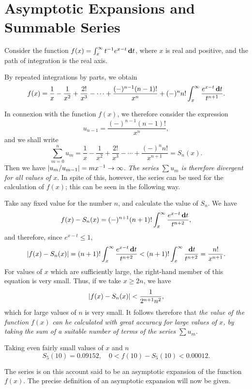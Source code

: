 \chapter{Asymptotic Expansions and Summable Series}


Consider the function $f(x) = \int_{x}^{\infty} t^{-1} e^{x-t}
\, \mathbf{d} t$, where $x$ is real and positive, and the path of
integration is the real axis.

By repeated integrations by parts, we obtain
$$
f(x) = \frac{1}{x} - \frac{1}{x^{2}} + \frac{2!}{x^{3}} - \cdots +
\frac{ (-)^{n-1} (n-1)!}{x^{n}} + (-)^{n} n! \int_{x}^{\infty}
\frac{e^{x-t} \, \mathbf{d} t}{t^{n+1}}.
$$

In connexion with the function $f(x)$, we therefore consider the
expression
$$
u_{n-1} = \frac{ (-)^{n-1} (n-1)!}{x^{n}},
$$
and we shall write
$$
\sum_{m=0}^{n} u_{m} = \frac{1}{x} - \frac{1}{x^{2}} +
\frac{2!}{x^{3}} - \cdots + \frac{ (-)^{n} n!}{x^{n+1}} = S_{n}(x).
$$
Then we have $\left| u_{m}/u_{m-1} \right| = mx^{-1} \rightarrow \infty$.
\emph{The series $\sum u_{m}$ is therefore divergent for all values of
$x$}. In spite of this, however, the series can be used for the
calculation of $f(x)$; this can be seen in the following way.

Take any fixed value for the number $n$, and calculate the value of
$S_{n}$. We have
$$
f(x) - S_{n}(x) = (-)^{n+1} (n+1)! \int_{x}^{\infty} \frac{e^{x-t}
\, \mathbf{d} t}{t^{n+2}},
$$
and therefore, since $e^{x-t} \leq 1$,
$$
\left|  f(x) - S_{n}(x)  \right| = (n+1)! \int_{x}^{\infty} \frac{e^{x-t}
\, \mathbf{d} t}{t^{n+2}} < (n+1)! \int_{x}^{\infty} \frac{\, \mathbf{d}
t}{t^{n+2}} = \frac{n!}{x^{n+1}}.
$$
For values of $x$ which are sufficiently large, the right-hand member
of this equation is very small. Thus, if we take $x \geq 2n$, we have
$$
\left|  f(x) - S_{n}(x) \right| < \frac{1}{2^{n+1} n^{2}},
$$
which for large values of $n$ is very small. It follows therefore that
\emph{the value of the function $f(x)$ can he calculated with great
accuracy for large values of $x$, by taking the sum of a suitable
number of terms of the series $\sum u_{m}$}.

Taking even fairly small values of $x$ and $n$
$$
S_{5}(10) = 0.09152, \quad 0 < f(10) - S_{5}(10) < 0.00012.
$$
%
%

The series is on this account said to be an asymptotic expansion of
the function $f(x)$. The precise definition of an asymptotic expansion
will now be given.

